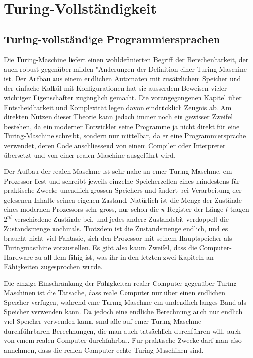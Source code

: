 %
%
%
\chapter{Turing-Vollständigkeit\label{chapter-vollstaendigkeit}}
\section{Turing-vollständige Programmiersprachen}
Die Turing-Maschine liefert einen wohldefinierten Begriff der
Berechenbarkeit, der auch robust gegenüber milden "Anderungen
der Definition einer Turing-Maschine ist.
Der Aufbau aus einem endlichen Automaten mit zusätzlichem
Speicher und der einfache Kalkül mit Konfigurationen hat
sie ausserdem Beweisen vieler wichtiger Eigenschaften zugänglich
gemacht. Die vorangegangenen Kapitel über Entscheidbarkeit und
Komplexität legen davon eindrücklich Zeugnis ab. Am direkten
Nutzen dieser Theorie kann jedoch immer noch ein gewisser Zweifel
bestehen, da ein moderner Entwickler seine Programme ja nicht
direkt für eine Turing-Maschine schreibt, sondern nur mittelbar,
da er eine Programmiersprache verwendet, deren Code anschliessend
von einem Compiler oder Interpreter übersetzt und von einer realen
Maschine ausgeführt wird.

Der Aufbau der realen Maschine ist sehr
nahe an einer Turing-Maschine, ein Prozessor liest und schreibt
jeweils einzelne
Speicherzellen eines mindestens für praktische Zwecke unendlich
grossen Speichers und ändert bei Verarbeitung der gelesenen
Inhalte seinen eigenen Zustand. Natürlich ist die Menge der
Zustände eines modernen Prozessors sehr gross, nur schon die $n$
Register der Länge $l$ tragen $2^{nl}$ verschiedene Zustände bei,
und jedes andere Zustandsbit verdoppelt die Zustandsmenge nochmals.
Trotzdem ist die Zustandsmenge endlich, und es braucht nicht viel
Fantasie, sich den Prozessor mit seinem Hauptspeicher als Turingmaschine
vorzustellen. Es gibt also kaum Zweifel, dass die Computer-Hardware
zu all dem fähig ist, was ihr in den letzten zwei Kapiteln an
Fähigkeiten zugesprochen wurde.

Die einzige Einschränkung der Fähigkeiten realer Computer gegenüber
Turing-Maschinen ist
die Tatsache, dass reale Computer nur über einen endlichen Speicher
verfügen, während eine Turing-Maschine ein undendlich langes Band
als Speicher verwenden kann. Da jedoch eine endliche Berechnung auch
nur endlich viel Speicher verwenden kann, sind alle auf einer Turing-Maschine
durchführbaren Berechnungen, die man auch tatsächlich durchführen
will, auch von einem realen Computer durchführbar. Für praktische
Zwecke darf man also annehmen, dass die realen Computer echte Turing-Maschinen
sind.

